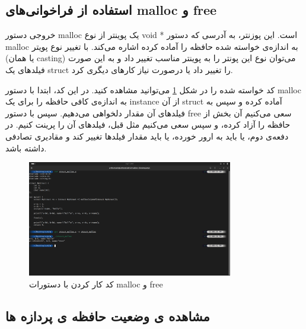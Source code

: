\documentclass[12pt]{article}
\begin{document}
        \subsection{استفاده از فراخوانی‌های \textenglish{malloc} و \textenglish{free}}
        

        خروجی دستور
        \textenglish{malloc}
        یک پوینتر از نوع
        \textenglish{void *}
        است. این پوزنتر، به آدرسی که دستور
        \textenglish{malloc}
        به اندازه‌ی خواسته شده حافظه را آماده کرده اشاره می‌کند.
        با تغییر نوع پویتر (یا همان
        \textenglish{casting})
        می‌توان نوع این پونتر را به پوینتر مناسب تغییر داد و به این صورت 
        فیلدهای یک 
        \textenglish{struct}
        را تغییر داد یا درصورت نیاز کارهای دیگری کرد.

        کد خواسته شده را در شکل 
        \ref{im1}
        می‌توانید مشاهده کنید. در این کد، ابتدا با دستور
        \textenglish{malloc}
        به اندازه‌ی کافی حافظه را برای یک 
        \textenglish{instance}
        از آن
        \textenglish{struct}
        آماده کرده و سپس به فیلدهای آن مقدار دلخواهی می‌دهیم. سپس با دستور
        \textenglish{free}
        سعی می‌کنیم آن بخش از حافظه را آزاد کرده، و سپس سعی می‌کنیم مثل قبل، فیلدهای آن را پرینت کنیم. در دفعه‌ی دوم، یا باید به ارور خورده، یا باید مقدار فیلدها تغییر کند و مقادیری تصادفی داشته باشد.

        \begin{figure}[H]
		\centering
		\includegraphics[width=0.8\textwidth]{report6-resources/1.png}
		\caption{کد کار کردن با دستورات \textenglish{malloc} و \textenglish{free}}
            \label{im1}
	\end{figure}

        \subsection{مشاهده ی وضعیت حافظه ی پردازه ها}
\end{document}
